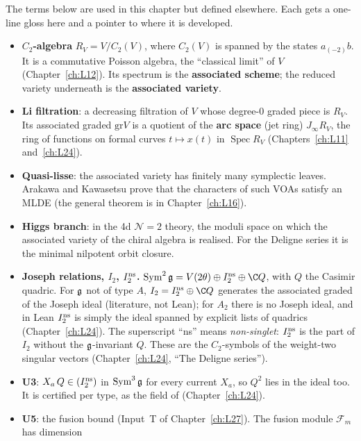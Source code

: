 The terms below are used in this chapter but defined elsewhere. Each gets a one-line gloss here and a pointer to
where it is developed.
\begin{itemize}
\item \textbf{$C_2$-algebra} $R_V=V/C_2(V)$, where $C_2(V)$ is spanned by the states $a_{(-2)}b$. It is a
  commutative Poisson algebra, the ``classical limit'' of $V$ (Chapter~\ref{ch:L12}). Its spectrum is the
  \textbf{associated scheme}; the reduced variety underneath is the \textbf{associated variety}.
\item \textbf{Li filtration}: a decreasing filtration of $V$ whose degree-$0$ graded piece is $R_V$. Its associated
  graded $\mathrm{gr}V$ is a quotient of the \textbf{arc space} (jet ring) $J_\infty R_V$, the ring of functions on
  formal curves $t\mapsto x(t)$ in $\operatorname{Spec}R_V$ (Chapters~\ref{ch:L11} and~\ref{ch:L24}).
\item \textbf{Quasi-lisse}: the associated variety has finitely many symplectic leaves. Arakawa and Kawasetsu prove
  that the characters of such VOAs satisfy an MLDE (the general theorem is in Chapter~\ref{ch:L16}).
\item \textbf{Higgs branch}: in the 4d $\mathcal N=2$ theory, the moduli space on which the associated variety of the
  chiral algebra is realised. For the Deligne series it is the minimal nilpotent orbit closure.
\item \textbf{Joseph relations, $I_2$, $I_2^{\rm ns}$.} $\operatorname{Sym}^2\ltwentyfiveg=V(2\theta)\oplus
  I_2^{\rm ns}\oplus\C Q$, with $Q$ the Casimir quadric. For $\mathfrak g$ not of type $A$, $I_2=I_2^{\rm ns}\oplus\C Q$
  generates the associated graded of the Joseph ideal (literature, not Lean); for $A_2$ there is no Joseph ideal, and
  in Lean $I_2^{\rm ns}$ is simply the ideal spanned by explicit lists of quadrics (Chapter~\ref{ch:L24}). The superscript ``ns'' means \emph{non-singlet}: $I_2^{\rm ns}$ is the part of $I_2$ without
  the $\mathfrak g$-invariant $Q$. These are the $C_2$-symbols of the weight-two singular vectors (Chapter~\ref{ch:L24},
  ``The Deligne series'').
\item \textbf{U3}: $X_a\,Q\in(I_2^{\rm ns})$ in $\operatorname{Sym}^3\mathfrak g$ for every current $X_a$, so $Q^2$ lies in
  the ideal too. It is certified per type, as the field  of  (Chapter~\ref{ch:L24}).
\item \textbf{U5}: the fusion bound (Input~T of Chapter~\ref{ch:L27}). The fusion module $\mathcal F_m$ has dimension

\end{itemize}
